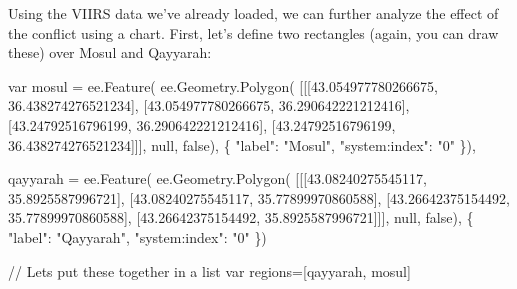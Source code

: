 \documentclass[
  letterpaper,
  DIV=11,
  numbers=noendperiod]{scrreprt}
\newenvironment{Shaded}{\begin{snugshade}}{\end{snugshade}}
\newcommand{\AttributeTok}[1]{\textcolor[rgb]{0.40,0.45,0.13}{#1}}
\newcommand{\CommentTok}[1]{\textcolor[rgb]{0.37,0.37,0.37}{#1}}
\newcommand{\FloatTok}[1]{\textcolor[rgb]{0.68,0.00,0.00}{#1}}
\newcommand{\FunctionTok}[1]{\textcolor[rgb]{0.28,0.35,0.67}{#1}}
\newcommand{\KeywordTok}[1]{\textcolor[rgb]{0.00,0.23,0.31}{#1}}
\newcommand{\NormalTok}[1]{\textcolor[rgb]{0.00,0.23,0.31}{#1}}
\newcommand{\OperatorTok}[1]{\textcolor[rgb]{0.37,0.37,0.37}{#1}}
\newcommand{\StringTok}[1]{\textcolor[rgb]{0.13,0.47,0.30}{#1}}
\begin{document}
Using the VIIRS data we've already loaded, we can further analyze the
effect of the conflict using a chart. First, let's define two rectangles
(again, you can draw these) over Mosul and Qayyarah:

\begin{Shaded}
\begin{Highlighting}[]
\KeywordTok{var}\NormalTok{ mosul }\OperatorTok{=}\NormalTok{ ee}\OperatorTok{.}\FunctionTok{Feature}\NormalTok{(}
\NormalTok{        ee}\OperatorTok{.}\AttributeTok{Geometry}\OperatorTok{.}\FunctionTok{Polygon}\NormalTok{(}
\NormalTok{            [[[}\FloatTok{43.054977780266675}\OperatorTok{,} \FloatTok{36.438274276521234}\NormalTok{]}\OperatorTok{,}
\NormalTok{              [}\FloatTok{43.054977780266675}\OperatorTok{,} \FloatTok{36.290642221212416}\NormalTok{]}\OperatorTok{,}
\NormalTok{              [}\FloatTok{43.24792516796199}\OperatorTok{,} \FloatTok{36.290642221212416}\NormalTok{]}\OperatorTok{,}
\NormalTok{              [}\FloatTok{43.24792516796199}\OperatorTok{,} \FloatTok{36.438274276521234}\NormalTok{]]]}\OperatorTok{,} \KeywordTok{null}\OperatorTok{,} \KeywordTok{false}\NormalTok{)}\OperatorTok{,}
\NormalTok{        \{}
          \StringTok{"label"}\OperatorTok{:} \StringTok{"Mosul"}\OperatorTok{,}
          \StringTok{"system:index"}\OperatorTok{:} \StringTok{"0"}
\NormalTok{        \})}\OperatorTok{,}

\NormalTok{    qayyarah }\OperatorTok{=}\NormalTok{ ee}\OperatorTok{.}\FunctionTok{Feature}\NormalTok{(}
\NormalTok{        ee}\OperatorTok{.}\AttributeTok{Geometry}\OperatorTok{.}\FunctionTok{Polygon}\NormalTok{(}
\NormalTok{            [[[}\FloatTok{43.08240275545117}\OperatorTok{,} \FloatTok{35.8925587996721}\NormalTok{]}\OperatorTok{,}
\NormalTok{              [}\FloatTok{43.08240275545117}\OperatorTok{,} \FloatTok{35.77899970860588}\NormalTok{]}\OperatorTok{,}
\NormalTok{              [}\FloatTok{43.26642375154492}\OperatorTok{,} \FloatTok{35.77899970860588}\NormalTok{]}\OperatorTok{,}
\NormalTok{              [}\FloatTok{43.26642375154492}\OperatorTok{,} \FloatTok{35.8925587996721}\NormalTok{]]]}\OperatorTok{,} \KeywordTok{null}\OperatorTok{,} \KeywordTok{false}\NormalTok{)}\OperatorTok{,}
\NormalTok{        \{}
          \StringTok{"label"}\OperatorTok{:} \StringTok{"Qayyarah"}\OperatorTok{,}
          \StringTok{"system:index"}\OperatorTok{:} \StringTok{"0"}
\NormalTok{        \})}

\CommentTok{// Let\textquotesingle{}s put these together in a list }
\KeywordTok{var}\NormalTok{ regions}\OperatorTok{=}\NormalTok{[qayyarah}\OperatorTok{,}\NormalTok{ mosul]}
\end{Highlighting}
\end{Shaded}
\end{document}
